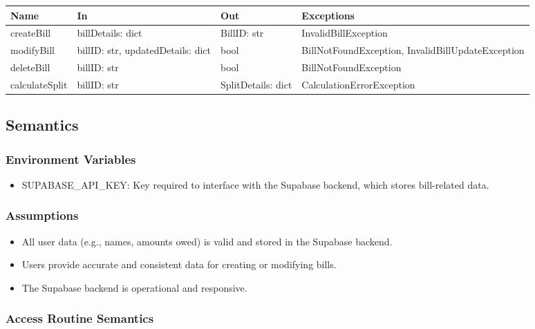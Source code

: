 \documentclass[12pt, titlepage]{article}
\begin{document}
\begin{center}
\begin{tabular}{p{3cm} p{5cm} p{3cm} p{5cm}}
\hline
\textbf{Name} & \textbf{In} & \textbf{Out} & \textbf{Exceptions} \\
\hline
createBill & billDetails: dict & BillID: str & InvalidBillException \\

modifyBill & billID: str, updatedDetails: dict & bool & BillNotFoundException, InvalidBillUpdateException \\

deleteBill & billID: str & bool & BillNotFoundException \\

calculateSplit & billID: str & SplitDetails: dict & CalculationErrorException \\
\hline
\end{tabular}
\end{center}

\subsection{Semantics}

\subsubsection{Environment Variables}

\begin{itemize}
\item SUPABASE{\_}API{\_}KEY: Key required to interface with the Supabase backend, which stores bill-related data.
\end{itemize}

\subsubsection{Assumptions}

\begin{itemize}
  \item All user data (e.g., names, amounts owed) is valid and stored in the Supabase backend.
  \item Users provide accurate and consistent data for creating or modifying bills.
  \item The Supabase backend is operational and responsive.
\end{itemize}

\subsubsection{Access Routine Semantics}
\end{document}
